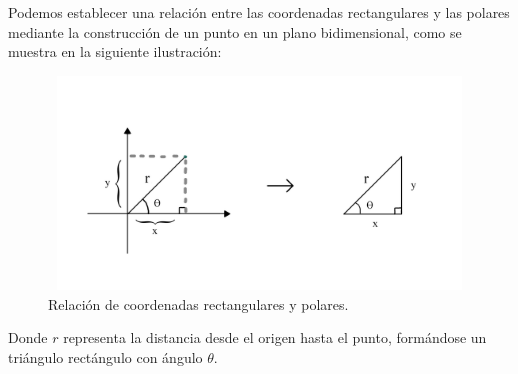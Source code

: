 Podemos establecer una relación entre las coordenadas rectangulares y las polares mediante la construcción de un punto en un plano bidimensional, como se muestra en la siguiente ilustración:

\begin{figure}[H]
  \centering
  \includegraphics[width=11.17cm, height=5.67cm]{img/graph/relacion_r}
  \caption{Relación de coordenadas rectangulares y polares.}
  \label{relacion_de_coordenadas}
\end{figure}

Donde $r$ representa la distancia desde el origen hasta el punto, formándose un triángulo rectángulo con ángulo $\theta$.
